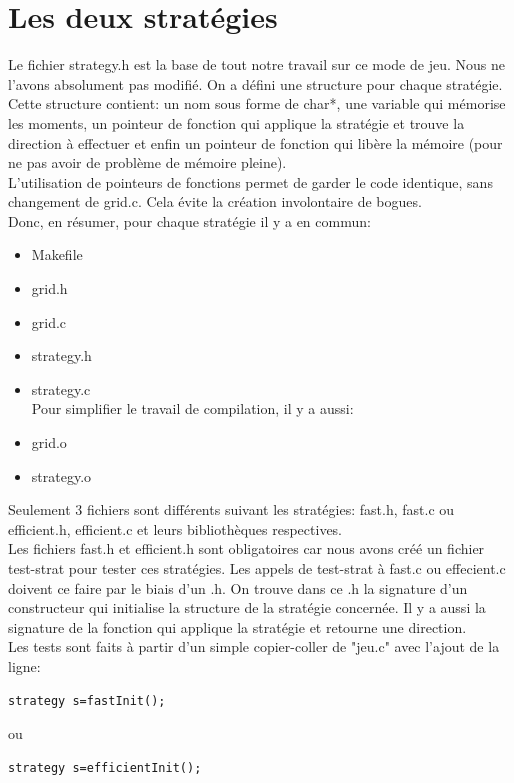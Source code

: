\documentclass{report}
\begin{document}
\section{Les deux stratégies}
Le fichier strategy.h est la base de tout notre travail sur ce mode de jeu. Nous ne l'avons absolument pas modifié. On a défini une structure pour chaque stratégie. Cette structure contient: un nom sous forme de char*, une variable qui mémorise les moments, un pointeur de fonction qui applique la stratégie et trouve la direction à effectuer et enfin un pointeur de fonction qui libère la mémoire (pour ne pas avoir de problème de mémoire pleine).\\
L'utilisation de pointeurs de fonctions permet de garder le code identique, sans changement de grid.c. Cela évite la création involontaire de bogues.\\
Donc, en résumer, pour chaque stratégie il y a en commun:
\begin{itemize}
\item Makefile
\item grid.h
\item grid.c
\item strategy.h
\item strategy.c\\
Pour simplifier le travail de compilation, il y a aussi:
\item grid.o
\item strategy.o\\
\end{itemize}
Seulement 3 fichiers sont différents suivant les stratégies: fast.h, fast.c ou efficient.h, efficient.c et leurs bibliothèques respectives.\\
Les fichiers fast.h et efficient.h sont obligatoires car nous avons créé un fichier test-strat pour tester ces stratégies. Les appels de test-strat à fast.c ou effecient.c doivent ce faire par le biais d'un .h. On trouve dans ce .h la signature d'un constructeur qui initialise la structure de la stratégie concernée. Il y a aussi la signature de la fonction qui applique la stratégie et retourne une direction.\\
Les tests sont faits à partir d'un simple copier-coller de "jeu.c" avec l'ajout de la ligne:
\begin{lstlisting}[frame=single]
strategy s=fastInit();
\end{lstlisting}
ou
\begin{lstlisting}[frame=single]
strategy s=efficientInit();
\end{lstlisting}
\end{document}
